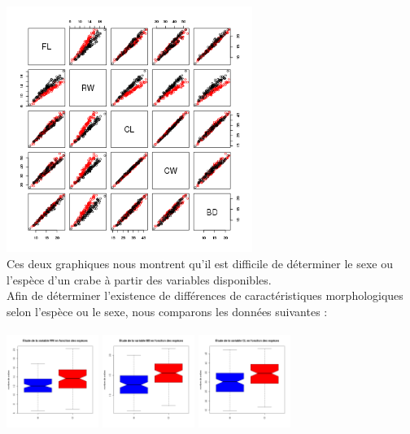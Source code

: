 \documentclass[a4paper, 10pt]{article}
\begin{document}
\includegraphics[height = 8cm, width = 8cm]{plots/plot_crabsquant_sex.png}\\
Ces deux graphiques nous montrent qu'il est difficile de d\'eterminer le sexe ou l'esp\`ece d'un crabe \`a partir des variables disponibles.\\
Afin de d\'eterminer l'existence de diff\'erences de caract\'eristiques morphologiques selon l'esp\`ece ou le sexe, nous comparons les donn\'ees
suivantes :\\
\includegraphics[height = 4cm, width = 3cm]{plots/boxplot_rw_espece.png}
\includegraphics[height = 4cm, width = 3cm]{plots/boxplot_bd_espece.png}
\includegraphics[height = 4cm, width = 3cm]{plots/boxplot_cl_espece.png}
\end{document}
